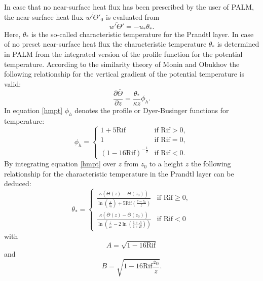 \documentclass[11pt,a4paper,titlepage]{scrreprt}
\begin{document}
In case that no near-surface heat flux has been prescribed by the user of PALM, the near-surface heat flux $\overline{w'\Theta'}_0$ is evaluated from
\begin{equation} \label{hfe}
\overline{w'\Theta'} = - u_{\ast} \theta_{\ast}.
\end{equation}
Here, $\theta_{\ast}$ is the so-called characteristic temperature for the Prandtl layer. In case of no preset near-surface heat flux the characteristic 
temperature $\theta_{\ast}$ is determined in PALM from the integrated version of the profile function for the potential temperature. According to the 
similarity theory of Monin and Obukhov the following relationship for the vertical gradient of the potential temperature is valid:
\begin{equation} \label{hmpt}
\frac{\partial \overline{\Theta}}{\partial z} = \frac{\theta_{\ast}}{\kappa z} \phi_h.
\end{equation}  
In equation \ref{hmpt} $\phi_h$ denotes the profile or Dyer-Businger functions for temperature:
\begin{equation}
\phi_h = 
\begin{cases}
1+5 \text{Rif} & \text{if $\text{Rif} > 0$}, \\
1 & \text{if $\text{Rif} = 0$}, \\
\left ( 1 - 16 \text{Rif} \right )^{-\frac{1}{2}} & \text{if $\text{Rif} < 0$}. 
\end{cases}
\end{equation} 
By integrating equation \ref{hmpt} over $z$ from $z_0$ to a height $z$ the following relationship for the characteristic temperature in the Prandtl 
layer can be deduced:    
\begin{equation} \label{tsb}
\theta_{\ast} =
\begin{cases}
\frac{\kappa \left ( \overline{\Theta}(z) - \overline{\Theta}(z_0) \right )}{\ln \left ( \frac{z}{z_0} \right ) + 5 \text{Rif} \left ( \frac{z-z_0}{z} \right )} & \text{if $\text{Rif} \ge 0$}, \\
\frac{\kappa \left ( \overline{\Theta}(z) - \overline{\Theta}(z_0) \right )}{\ln \left ( \frac{z}{z_0} - 2 \ln \left ( \frac{1+A}{1+B} \right )\right )} & \text{if $\text{Rif}<0$}
\end{cases} 
\end{equation}
with
\begin{equation}
A=\sqrt{1 - 16 \text{Rif}} 
\end{equation}
and
\begin{equation}
B=\sqrt{1 - 16 \text{Rif} \frac{z_0}{z}}.
\end{equation}
\end{document}
